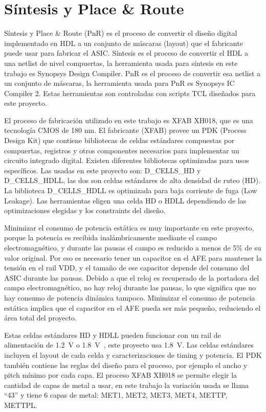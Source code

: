 \documentclass[a4paper, twoside, 11pt]{report}
\begin{document}
\FloatBarrier
\chapter{Síntesis y Place \& Route}

Síntesis y Place \& Route (PnR) es el proceso de convertir el diseño digital implementado en HDL a un conjunto de máscaras (layout) que el fabricante puede usar para fabricar el ASIC. Síntesis es el proceso de convertir el HDL a una netlist de nivel compuertas, la herramienta usada para síntesis en este trabajo es Synopsys Design Compiler. PnR es el proceso de convertir esa netlist a un conjunto de máscaras, la herramienta usada para PnR es Synopsys IC Compiler 2. Estas herramientas son controladas con scripts TCL diseñados para este proyecto.

El proceso de fabricación utilizado en este trabajo es XFAB XH018, que es una tecnología CMOS de 180 nm. El fabricante (XFAB) provee un PDK (Process Design Kit) que contiene bibliotecas de celdas estándares compuestas por compuertas, registros y otros componentes necesarios para implementar un circuito integrado digital. Existen diferentes bibliotecas optimizadas para usos específicos. Las usadas en este proyecto son: D\_CELLS\_HD y D\_CELLS\_HDLL, las dos son celdas estándares de alta densidad de ruteo (HD). La biblioteca D\_CELLS\_HDLL es optimizada para baja corriente de fuga (Low Leakage). Las herramientas eligen una celda HD o HDLL dependiendo de las optimizaciones elegidas y los constraints del diseño.

Minimizar el consumo de potencia estática es muy importante en este proyecto, porque la potencia es recibida inalámbricamente mediante el campo electromagnético, y durante las pausas el campo es reducido a menos de 5\% de su valor original. Por eso es necesario tener un capacitor en el AFE para mantener la tensión en el rail VDD, y el tamaño de ese capacitor depende del consumo del ASIC durante las pausas. Debido a que el reloj es recuperado de la portadora del campo electromagnético, no hay reloj durante las pausas, lo que significa que no hay consumo de potencia dinámica tampoco. Minimizar el consumo de potencia estática implica que el capacitor en el AFE pueda ser más pequeño, reduciendo el área total del proyecto.

Estas celdas estándares HD y HDLL pueden funcionar con un rail de alimentación de \SI{1.2}{\volt} o \SI{1.8}{\volt}~\cite{xfab_dig_libs_overview}, este proyecto usa \SI{1.8}{\volt}. Las celdas estándares incluyen el layout de cada celda y caracterizaciones de timing y potencia. El PDK también contiene las reglas del diseño para el proceso, por ejemplo el ancho y pitch mínimo por cada capa. El proceso XFAB XH018 se permite elegir la cantidad de capas de metal a usar, en este trabajo la variación usada se llama “43” y tiene 6 capas de metal: MET1, MET2, MET3, MET4, METTP, METTPL.
\end{document}
